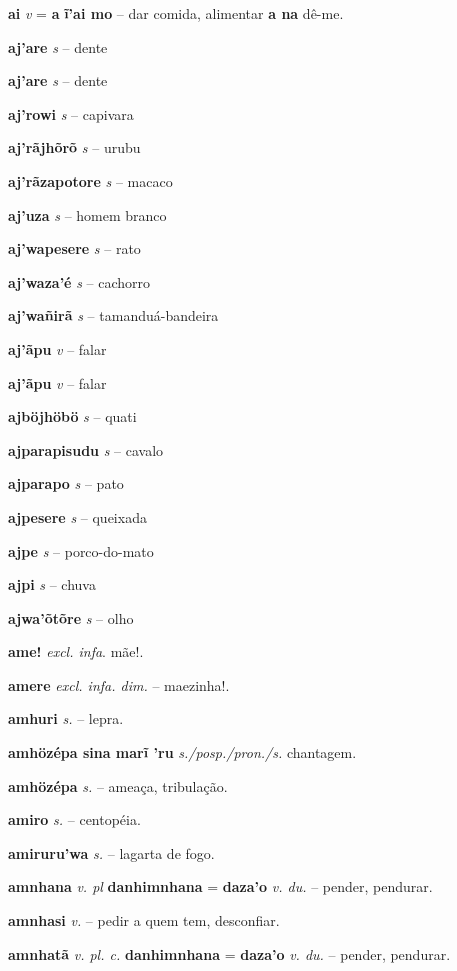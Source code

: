 \textbf{ai} \textit{v} = \textbf{a}  \textbf{ĩ'ai mo} -- dar comida, alimentar  \textbf{a na} dê-me.

\textbf{aj'are} \textit{s} -- {dente}

\textbf{aj'are} \textit{s} -- {dente}

\textbf{aj'rowi} \textit{s} -- {capivara}

\textbf{aj'rãjhõrõ} \textit{s} -- {urubu}

\textbf{aj'rãzapotore} \textit{s} -- {macaco}

\textbf{aj'uza} \textit{s} -- {homem branco}

\textbf{aj'wapesere} \textit{s} -- {rato}

\textbf{aj'waza'é} \textit{s} -- {cachorro}

\textbf{aj'wañirã} \textit{s} -- {tamanduá-bandeira}

\textbf{aj'ãpu} \textit{v} -- {falar}

\textbf{aj'ãpu} \textit{v} -- {falar}

\textbf{ajböjhöbö} \textit{s} -- {quati}

\textbf{ajparapisudu} \textit{s} -- {cavalo}

\textbf{ajparapo} \textit{s} -- {pato}

\textbf{ajpesere} \textit{s} -- {queixada}

\textbf{ajpe} \textit{s} -- {porco-do-mato}

\textbf{ajpi} \textit{s} -- {chuva}

\textbf{ajwa'õtõre} \textit{s} -- {olho}

\textbf{ame!} \textit{excl. infa}. mãe!.

\textbf{amere} \textit{excl. infa. dim.} -- maezinha!.

\textbf{amhuri} \textit{s.} -- lepra.

\textbf{amhözépa sina marĩ 'ru} \textit{s./posp./pron./s.} chantagem.

\textbf{amhözépa} \textit{s.} -- ameaça, tribulação.

\textbf{amiro} \textit{s.} -- centopéia.

\textbf{amiruru'wa} \textit{s.} -- lagarta de fogo.

\textbf{amnhana} \textit{v. pl} \textbf{danhimnhana} = \textbf{daza'o} \textit{v. du.} -- pender, pendurar.

\textbf{amnhasi} \textit{v.} -- pedir a quem tem, desconfiar.

\textbf{amnhatã} \textit{v. pl. c.} \textbf{danhimnhana} = \textbf{daza'o} \textit{v. du.} -- pender, pendurar.

